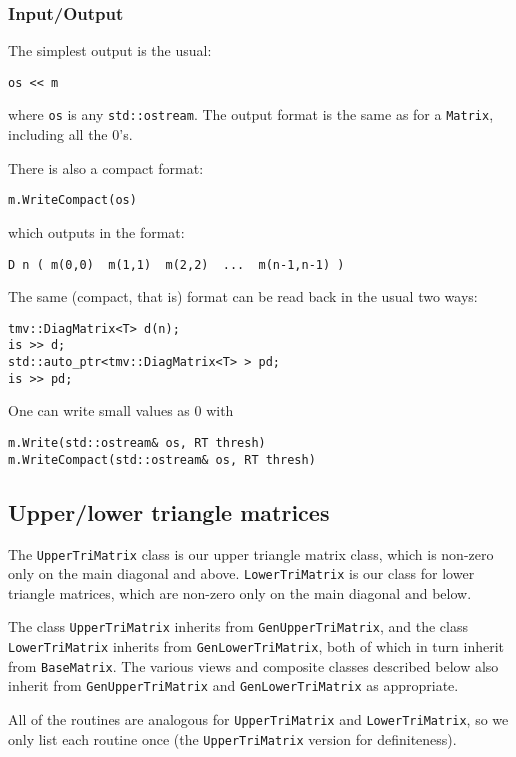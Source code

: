 \documentclass[twoside,letterpaper,11pt]{article}
\renewcommand{\tt}[1]{{\texttt {#1}}}
\begin{document}
\subsubsection{Input/Output}

The simplest output is the usual:
\begin{verbatim}
os << m
\end{verbatim}
where \tt{os} is any \tt{std::ostream}.
The output format is the same as for a \tt{Matrix}, including all the 0's.

There is also a compact format:
\begin{verbatim}
m.WriteCompact(os)
\end{verbatim}
which outputs in the format:
\begin{verbatim}
D n ( m(0,0)  m(1,1)  m(2,2)  ...  m(n-1,n-1) )
\end{verbatim}

The same (compact, that is) format can be read back in the usual two ways:
\begin{verbatim}
tmv::DiagMatrix<T> d(n);
is >> d;
std::auto_ptr<tmv::DiagMatrix<T> > pd;
is >> pd;
\end{verbatim}

One can write small values as 0 with
\begin{verbatim}
m.Write(std::ostream& os, RT thresh)
m.WriteCompact(std::ostream& os, RT thresh)
\end{verbatim}

\subsection{Upper/lower triangle matrices}

The \tt{UpperTriMatrix} class is our upper triangle matrix class, which is non-zero
only on the main diagonal and above.  \tt{LowerTriMatrix} is our class for lower
triangle matrices, which are non-zero only on the main diagonal and below.

The class \tt{UpperTriMatrix} inherits from \tt{GenUpperTriMatrix}, 
and the class \tt{LowerTriMatrix}
inherits from \tt{GenLowerTriMatrix}, both of
which in turn inherit from \tt{BaseMatrix}.  
The various views and composite classes described below
also inherit from \tt{GenUpperTriMatrix} and \tt{GenLowerTriMatrix} 
as appropriate.

All of the routines are analogous for \tt{UpperTriMatrix} and 
\tt{LowerTriMatrix}, so we only list each routine once 
(the \tt{UpperTriMatrix} version for
definiteness).  
\end{document}
